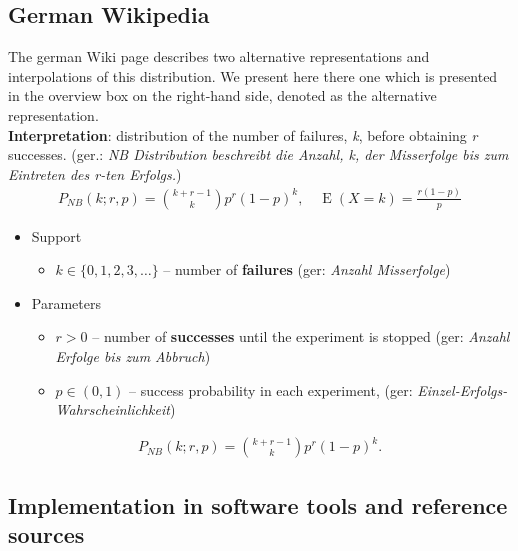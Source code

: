 \subsection*{German Wikipedia}
The german Wiki page describes two alternative representations and interpolations
of this distribution. We present here there one which is presented in the overview 
box on the right-hand side, denoted as the alternative representation.\\
\textbf{Interpretation}: distribution of the number of failures, \emph{k}, before obtaining \emph{r} successes. 
(ger.: \emph{NB Distribution beschreibt die Anzahl, k, der Misserfolge bis zum Eintreten des r-ten Erfolgs.})
\begin{align*}
P_{N\!B}(k;r,p) = {k + r - 1 \choose k} p^r (1-p)^k, \quad \operatorname E(X\!=\!k)=\frac{r(1-p)}{p}
\end{align*}
\begin{itemize}
\item 
Support
\begin{itemize}
\item 
$k \in \{ 0, 1, 2, 3, \dots\}$ -- number of \textbf{failures} (ger: \emph{Anzahl Misserfolge})
\end{itemize}
\item 
Parameters 
\begin{itemize}
\item 
$r > 0$ -- number of \textbf{successes} until the experiment is stopped (ger: \emph{Anzahl Erfolge bis zum Abbruch})
\item 
$p \in (0,1)$ -- success probability in each experiment, (ger: \emph{Einzel-Erfolgs-Wahrscheinlichkeit})
\end{itemize}
\end{itemize}
\begin{align*}
P_{N\!B}(k;r,p) = {k + r - 1 \choose k} p^r (1-p)^k  .
\end{align*}


\subsection{Implementation in software tools and reference sources}



















